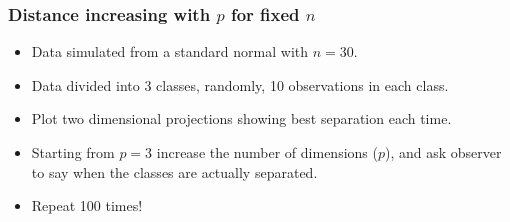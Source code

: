 \documentclass{beamer}
\begin{document}
\begin{frame}
\frametitle{Distance increasing with $p$ for fixed $n$}
\begin{itemize}
\item Data simulated from a standard normal with $n=30$. 
\item Data divided into 3 classes, randomly, 10 observations in each class.
\item Plot two dimensional projections showing best separation each time.
\item Starting from $p=3$ increase the number of dimensions ($p$), and ask observer to say when the classes are actually separated. 
\item Repeat 100 times!
\end{itemize}
\begin{center}

\end{center}
\end{frame}
\end{document}

